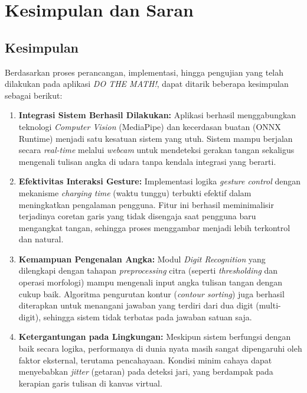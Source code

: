 \section{Kesimpulan dan Saran}

\subsection{Kesimpulan}
Berdasarkan proses perancangan, implementasi, hingga pengujian yang telah dilakukan pada aplikasi \textit{DO THE MATH!}, dapat ditarik beberapa kesimpulan sebagai berikut:

\begin{enumerate}
    \item \textbf{Integrasi Sistem Berhasil Dilakukan:}
    Aplikasi berhasil menggabungkan teknologi \textit{Computer Vision} (MediaPipe) dan kecerdasan buatan (ONNX Runtime) menjadi satu kesatuan sistem yang utuh. Sistem mampu berjalan secara \textit{real-time} melalui \textit{webcam} untuk mendeteksi gerakan tangan sekaligus mengenali tulisan angka di udara tanpa kendala integrasi yang berarti.

    \item \textbf{Efektivitas Interaksi Gesture:}
    Implementasi logika \textit{gesture control} dengan mekanisme \textit{charging time} (waktu tunggu) terbukti efektif dalam meningkatkan pengalaman pengguna. Fitur ini berhasil meminimalisir terjadinya coretan garis yang tidak disengaja saat pengguna baru mengangkat tangan, sehingga proses menggambar menjadi lebih terkontrol dan natural.

    \item \textbf{Kemampuan Pengenalan Angka:}
    Modul \textit{Digit Recognition} yang dilengkapi dengan tahapan \textit{preprocessing} citra (seperti \textit{thresholding} dan operasi morfologi) mampu mengenali input angka tulisan tangan dengan cukup baik. Algoritma pengurutan kontur (\textit{contour sorting}) juga berhasil diterapkan untuk menangani jawaban yang terdiri dari dua digit (multi-digit), sehingga sistem tidak terbatas pada jawaban satuan saja.

    \item \textbf{Ketergantungan pada Lingkungan:}
    Meskipun sistem berfungsi dengan baik secara logika, performanya di dunia nyata masih sangat dipengaruhi oleh faktor eksternal, terutama pencahayaan. Kondisi minim cahaya dapat menyebabkan \textit{jitter} (getaran) pada deteksi jari, yang berdampak pada kerapian garis tulisan di kanvas virtual.
\end{enumerate}

